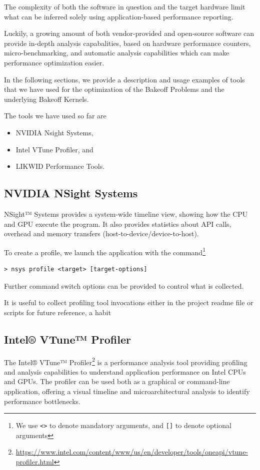 \documentclass[a4paper,12pt]{article}
\begin{document}
The complexity of both the software in question and the target hardware
limit what can be inferred solely using application-based performance reporting.

Luckily, a growing amount of both vendor-provided and open-source software can provide in-depth analysis capabalities, based on hardware performance counters, micro-benchmarking, and automatic analysis capabilities which can make performance optimization easier.

In the following sections, we provide a description and usage examples of
tools that we have used for the optimization of the Bakeoff Problems and
the underlying Bakeoff Kernels.

The tools we have used so far are
\begin{itemize}
    \item NVIDIA Nsight Systems,
    \item Intel VTune Profiler, and
    \item LIKWID Performance Tools.
\end{itemize}


\subsection{{NVIDIA NSight Systems}}

NSight™ Systems provides a system-wide timeline view, showing how the CPU and GPU
execute the program. It also provides statistics about API calls, overhead and memory transfers
(host-to-device/device-to-host).

To create a profile, we launch the application with the command\footnote{We use \texttt{<>} to denote mandatory arguments, and \texttt{[]} to denote optional arguments}
\begin{verbatim}
> nsys profile <target> [target-options]
\end{verbatim}
Further command switch options can be provided to control what is collected.

It is useful to collect profiling tool invocations either in the project readme file or scripts for future reference, a habit 

\subsection{{Intel® VTune™ Profiler}}

The Intel® VTune™ Profiler\footnote{\url{https://www.intel.com/content/www/us/en/developer/tools/oneapi/vtune-profiler.html}} is a performance analysis tool providing profiling
and analysis capabilities to understand application performance on Intel CPUs and GPUs.
The profiler can be used both as a graphical or command-line application,
offering a visual timeline and microarchitectural analysis to identify
performance bottlenecks.
\end{document}
